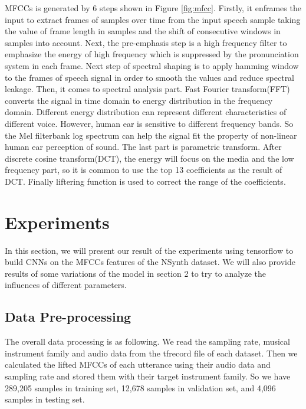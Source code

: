 \documentclass{article}
\begin{document}
MFCCs is generated by 6 steps shown in Figure \ref{fig:mfcc}. Firstly, it enframes the input to extract frames of samples over time from the input speech sample taking the value of frame length in samples and the shift of consecutive windows in samples into account. Next, the pre-emphasis step is a high frequency filter to emphasize the energy of high frequency which is suppressed by the pronunciation system in each frame. Next step of spectral shaping is to apply hamming window to the frames of speech signal in order to smooth the values and reduce spectral leakage. Then, it comes to spectral analysis part. Fast Fourier transform(FFT) converts the signal in time domain to energy distribution in the frequency domain. Different energy distribution can represent different characteristics of different voice. However, human ear is sensitive to different frequency bands. So the Mel filterbank log spectrum can help the signal fit the property of non-linear human ear perception of sound. The last part is parametric transform. After discrete cosine transform(DCT), the energy will focus on the media and the low frequency part, so it is common to use the top 13 coefficients as the result of DCT. Finally liftering function is used to correct the range of the coefficients.



\section{Experiments}

In this section, we will present our result of the experiments using tensorflow to build CNNs on the MFCCs features of the NSynth dataset. We will also provide results of some variations of the model in section 2 to try to analyze the influences of different parameters.

\subsection{Data Pre-processing}

The overall data processing is as following. We read the sampling rate, musical instrument family and audio data from the tfrecord file of each dataset. Then we calculated the lifted MFCCs of each utterance using their audio data and sampling rate and stored them with their target instrument family. So we have 289,205 samples in training set, 12,678 samples in validation set, and 4,096 samples in testing set.
\end{document}
